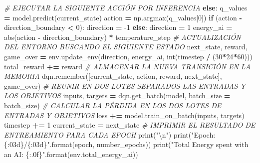 \documentclass[]{book}
\newenvironment{Shaded}{\begin{snugshade}}{\end{snugshade}}
\newcommand{\BuiltInTok}[1]{#1}
\newcommand{\CharTok}[1]{\textcolor[rgb]{0.31,0.60,0.02}{#1}}
\newcommand{\CommentTok}[1]{\textcolor[rgb]{0.56,0.35,0.01}{\textit{#1}}}
\newcommand{\ControlFlowTok}[1]{\textcolor[rgb]{0.13,0.29,0.53}{\textbf{#1}}}
\newcommand{\DecValTok}[1]{\textcolor[rgb]{0.00,0.00,0.81}{#1}}
\newcommand{\NormalTok}[1]{#1}
\newcommand{\OperatorTok}[1]{\textcolor[rgb]{0.81,0.36,0.00}{\textbf{#1}}}
\newcommand{\SpecialCharTok}[1]{\textcolor[rgb]{0.00,0.00,0.00}{#1}}
\newcommand{\StringTok}[1]{\textcolor[rgb]{0.31,0.60,0.02}{#1}}
\begin{document}
\begin{Shaded}
\begin{Highlighting}[]
            \CommentTok{# EJECUTAR LA SIGUIENTE ACCIÓN POR INFERENCIA}
            \ControlFlowTok{else}\NormalTok{:}
\NormalTok{                q_values }\OperatorTok{=}\NormalTok{ model.predict(current_state)}
\NormalTok{                action }\OperatorTok{=}\NormalTok{ np.argmax(q_values[}\DecValTok{0}\NormalTok{])}
                \ControlFlowTok{if}\NormalTok{ (action }\OperatorTok{-}\NormalTok{ direction_boundary }\OperatorTok{<} \DecValTok{0}\NormalTok{):}
\NormalTok{                    direction }\OperatorTok{=} \DecValTok{-1}
                \ControlFlowTok{else}\NormalTok{:}
\NormalTok{                    direction }\OperatorTok{=} \DecValTok{1}
\NormalTok{                energy_ai }\OperatorTok{=} \BuiltInTok{abs}\NormalTok{(action }\OperatorTok{-}\NormalTok{ direction_boundary) }\OperatorTok{*}\NormalTok{ temperature_step}
            \CommentTok{# ACTUALIZACIÓN DEL ENTORNO BUSCANDO EL SIGUIENTE ESTADO}
\NormalTok{            next_state, reward, game_over }\OperatorTok{=}\NormalTok{ env.update_env(direction,}
\NormalTok{                                                           energy_ai,}
                                                           \BuiltInTok{int}\NormalTok{(timestep }\OperatorTok{/}\NormalTok{ (}\DecValTok{30}\OperatorTok{*}\DecValTok{24}\OperatorTok{*}\DecValTok{60}\NormalTok{)))}
\NormalTok{            total_reward }\OperatorTok{+=}\NormalTok{ reward}
            \CommentTok{# ALMACENAR LA NUEVA TRANSICIÓN EN LA MEMORIA}
\NormalTok{            dqn.remember([current_state, action, reward, next_state], game_over)}
            \CommentTok{# REUNIR EN DOS LOTES SEPARADOS LAS ENTRADAS Y LOS OBJETIVOS}
\NormalTok{            inputs, targets }\OperatorTok{=}\NormalTok{ dqn.get_batch(model, batch_size }\OperatorTok{=}\NormalTok{ batch_size)}
            \CommentTok{# CALCULAR LA PÉRDIDA EN LOS DOS LOTES DE ENTRADAS Y OBJETIVOS}
\NormalTok{            loss }\OperatorTok{+=}\NormalTok{ model.train_on_batch(inputs, targets)}
\NormalTok{            timestep }\OperatorTok{+=} \DecValTok{1}
\NormalTok{            current_state }\OperatorTok{=}\NormalTok{ next_state}
        \CommentTok{# IMPRIMIR EL RESULTADO DE ENTREAMIENTO PARA CADA EPOCH}
        \BuiltInTok{print}\NormalTok{(}\StringTok{"}\CharTok{\textbackslash{}n}\StringTok{"}\NormalTok{)}
        \BuiltInTok{print}\NormalTok{(}\StringTok{"Epoch: }\SpecialCharTok{\{:03d\}}\StringTok{/}\SpecialCharTok{\{:03d\}}\StringTok{"}\NormalTok{.}\BuiltInTok{format}\NormalTok{(epoch, number_epochs))}
        \BuiltInTok{print}\NormalTok{(}\StringTok{"Total Energy spent with an AI: }\SpecialCharTok{\{:.0f\}}\StringTok{"}\NormalTok{.}\BuiltInTok{format}\NormalTok{(env.total_energy_ai))}

\end{Highlighting}
\end{Shaded}
\end{document}
